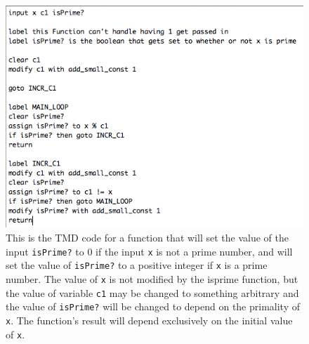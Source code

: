 \documentclass{report}
\begin{document}
\begin{figure} 
\begin{center} 
\includegraphics[scale=0.75]{figs/isprime.png} 
\caption{This is the TMD code for a function that will set the value of the input \texttt{isPrime?} to 0 if the input \texttt{x} is not a prime number, and will set the value of \texttt{isPrime?} to a positive integer if \texttt{x} is a prime number. The value of \texttt{x} is not modified by the isprime function, but the value of variable \texttt{c1} may be changed to something arbitrary and the value of \texttt{isPrime?} will be changed to depend on the primality of \texttt{x}. The function's result will depend exclusively on the initial value of \texttt{x}. \label{fig:isprime}} 
\end{center} 
\end{figure}
\end{document}
